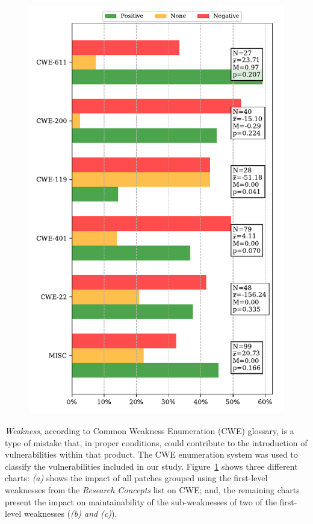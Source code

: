 \documentclass[10pt,conference]{IEEEtran}
\begin{document}
\begin{figure}[htp]
{	\includegraphics[scale=0.4]{figures/main_per_cwe_spec_664.pdf}}
	\label{fig:pat}
\end{figure}

\emph{Weakness}, according to Common Weakness Enumeration (CWE) glossary, 
is a type of mistake that, in proper conditions, could contribute to the 
introduction of vulnerabilities within that product. The CWE enumeration
system was used to classify the vulnerabilities included in our study.
Figure~\ref{fig:pat} shows three different charts: \emph{(a)} shows
the impact of all patches grouped using the first-level weaknesses from
the \emph{Research Concepts} list on CWE; and, the remaining charts
present the impact on maintainability of the sub-weaknesses of two of
the first-level weaknesses (\emph{(b) and (c)}). 
\end{document}

